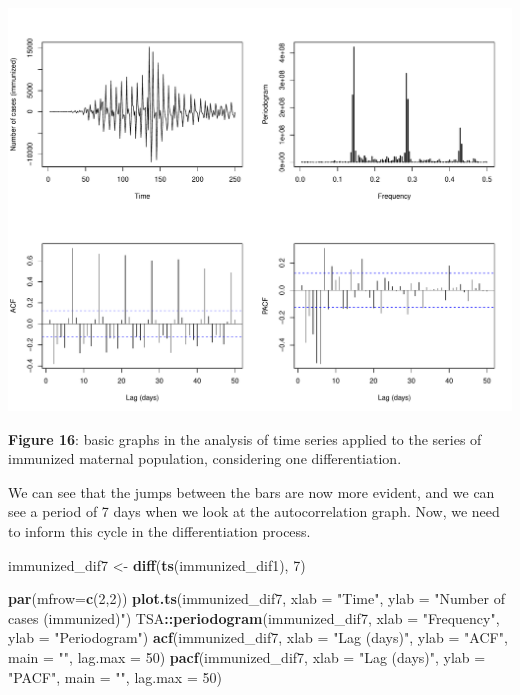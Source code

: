\documentclass[
]{article}
\newenvironment{Shaded}{\begin{snugshade}}{\end{snugshade}}
\newcommand{\AttributeTok}[1]{\textcolor[rgb]{0.13,0.29,0.53}{#1}}
\newcommand{\DecValTok}[1]{\textcolor[rgb]{0.00,0.00,0.81}{#1}}
\newcommand{\FunctionTok}[1]{\textcolor[rgb]{0.13,0.29,0.53}{\textbf{#1}}}
\newcommand{\NormalTok}[1]{#1}
\newcommand{\OtherTok}[1]{\textcolor[rgb]{0.56,0.35,0.01}{#1}}
\newcommand{\SpecialCharTok}[1]{\textcolor[rgb]{0.81,0.36,0.00}{\textbf{#1}}}
\newcommand{\StringTok}[1]{\textcolor[rgb]{0.31,0.60,0.02}{#1}}
\renewenvironment{Shaded}{\begin{mdframed}[ backgroundcolor=shadecolor, linecolor = shadecolor, leftmargin=\dimexpr\leftmargin-2pt\relax, innerleftmargin=1.6pt, innertopmargin=5pt, skipabove=10pt,skipbelow=3pt ]}{\end{mdframed}}
\begin{document}
\begin{center}\includegraphics[width=\linewidth]{IF_results_ENG_files/figure-latex/unnamed-chunk-20-1} \end{center}

\textbf{Figure 16}: basic graphs in the analysis of time series applied
to the series of immunized maternal population, considering one
differentiation.

We can see that the jumps between the bars are now more evident, and we
can see a period of 7 days when we look at the autocorrelation graph.
Now, we need to inform this cycle in the differentiation process.

\begin{Shaded}
\begin{Highlighting}[]
\NormalTok{immunized\_dif7 }\OtherTok{\textless{}{-}}
  \FunctionTok{diff}\NormalTok{(}\FunctionTok{ts}\NormalTok{(immunized\_dif1), }\DecValTok{7}\NormalTok{)}

\FunctionTok{par}\NormalTok{(}\AttributeTok{mfrow=}\FunctionTok{c}\NormalTok{(}\DecValTok{2}\NormalTok{,}\DecValTok{2}\NormalTok{))}
\FunctionTok{plot.ts}\NormalTok{(immunized\_dif7,}
        \AttributeTok{xlab =} \StringTok{"Time"}\NormalTok{,}
        \AttributeTok{ylab =} \StringTok{"Number of cases (immunized)"}\NormalTok{)}
\NormalTok{TSA}\SpecialCharTok{::}\FunctionTok{periodogram}\NormalTok{(immunized\_dif7,}
                 \AttributeTok{xlab =} \StringTok{"Frequency"}\NormalTok{,}
                 \AttributeTok{ylab =} \StringTok{"Periodogram"}\NormalTok{)}
\FunctionTok{acf}\NormalTok{(immunized\_dif7,}
    \AttributeTok{xlab =} \StringTok{"Lag (days)"}\NormalTok{,}
    \AttributeTok{ylab =} \StringTok{"ACF"}\NormalTok{,}
    \AttributeTok{main =} \StringTok{""}\NormalTok{,}
    \AttributeTok{lag.max =} \DecValTok{50}\NormalTok{)}
\FunctionTok{pacf}\NormalTok{(immunized\_dif7,}
     \AttributeTok{xlab =} \StringTok{"Lag (days)"}\NormalTok{,}
     \AttributeTok{ylab =} \StringTok{"PACF"}\NormalTok{,}
     \AttributeTok{main =} \StringTok{""}\NormalTok{,}
     \AttributeTok{lag.max =} \DecValTok{50}\NormalTok{)}
\end{Highlighting}
\end{Shaded}
\end{document}
